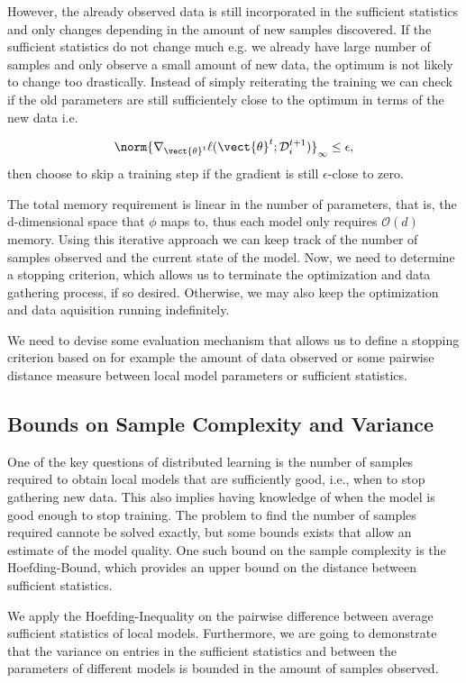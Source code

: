 However, the already observed data is still incorporated in the sufficient statistics and only changes depending in the amount of new samples discovered.
If the sufficient statistics do not change much e.g. we already have large number of samples and only observe a small amount of new data, the optimum is not likely to change too drastically. 
Instead of simply reiterating the training we can check if the old parameters are still sufficientely close to the optimum in terms of the new data i.e. 

\begin{equation}
    \norm{\nabla_{\vect{\theta}^t} \ell(\vect{\theta}^{t} ; \mathcal{D}_i^{t+1})}_{\infty} \leq \epsilon,
\end{equation}
then choose to skip a training step if the gradient is still $\epsilon$-close to zero.

The total memory requirement is linear  in the number of parameters, that is, the d-dimensional space that $\phi$ maps to, thus each model only requires $\mathcal{O}(d)$ memory.
Using this iterative approach we can keep track of the number of samples observed and the current state of the model.
Now, we need to determine a stopping criterion, which allows us to terminate the optimization and data gathering process, if so desired. 
Otherwise, we may also keep the optimization and data aquisition running indefinitely.

We need to devise some evaluation mechanism that allows us to define a stopping criterion based on for example the amount of data observed or some pairwise distance measure between local model parameters or sufficient statistics.

\subsection{Bounds on Sample Complexity and Variance}
One of the key questions of distributed learning is the number of samples required to obtain local models that are sufficiently good, i.e., when to stop gathering new data.
This also implies having knowledge of when the model is good enough to stop training.
The problem to find the number of samples required cannote be solved exactly, but some bounds exists that allow an estimate of the model quality.
One such bound on the sample complexity is the Hoefding-Bound, which provides an upper bound on the distance between sufficient statistics.
 
We apply the Hoefding-Inequality on the pairwise difference between average sufficient statistics of local models.
Furthermore, we are going to demonstrate that the variance on entries in the sufficient statistics and between the parameters of different models is bounded in the amount of samples observed.

